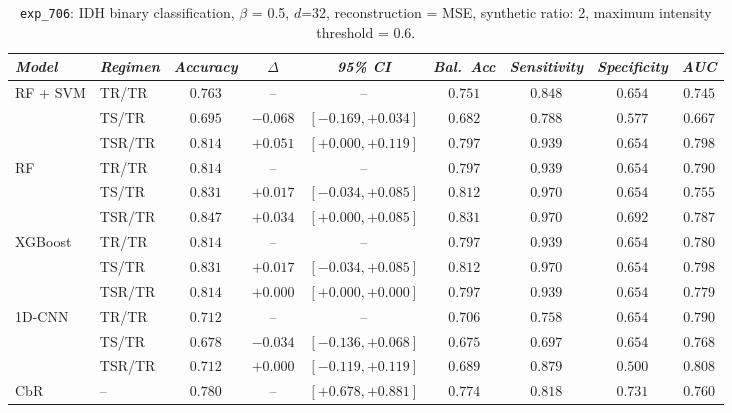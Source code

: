 \begin{table}[H]
\centering
\scriptsize

\label{tab:ctrl_exp_706}
\begin{tabular*}{\textwidth}{@{\extracolsep{\fill}}llccccccc}
\toprule
\emph{Model} & \emph{Regimen} & \emph{Accuracy} & \emph{$\Delta$} & \emph{95\% CI} & \emph{Bal.\ Acc} & \emph{Sensitivity} & \emph{Specificity} & \emph{AUC}\\
\midrule
\multirow{3}{*}{RF + SVM} & TR/TR & $0.763$ & -- & -- & $0.751$ & $0.848$ & $0.654$ & $0.745$\\
 & TS/TR & $0.695$ & $-0.068$ & $[-0.169, +0.034]$ & $0.682$ & $0.788$ & $0.577$ & $0.667$\\
 & TSR/TR & $0.814$ & $+0.051$ & $[+0.000, +0.119]$ & $0.797$ & $0.939$ & $0.654$ & $0.798$\\
\midrule
\multirow{3}{*}{RF} & TR/TR & $0.814$ & -- & -- & $0.797$ & $0.939$ & $0.654$ & $0.790$\\
 & TS/TR & $0.831$ & $+0.017$ & $[-0.034, +0.085]$ & $0.812$ & $0.970$ & $0.654$ & $0.755$\\
 & TSR/TR & $0.847$ & $+0.034$ & $[+0.000, +0.085]$ & $0.831$ & $0.970$ & $0.692$ & $0.787$\\
\midrule
\multirow{3}{*}{XGBoost} & TR/TR & $0.814$ & -- & -- & $0.797$ & $0.939$ & $0.654$ & $0.780$\\
 & TS/TR & $0.831$ & $+0.017$ & $[-0.034, +0.085]$ & $0.812$ & $0.970$ & $0.654$ & $0.798$\\
 & TSR/TR & $0.814$ & $+0.000$ & $[+0.000, +0.000]$ & $0.797$ & $0.939$ & $0.654$ & $0.779$\\
\midrule
\multirow{3}{*}{1D-CNN} & TR/TR & $0.712$ & -- & -- & $0.706$ & $0.758$ & $0.654$ & $0.790$\\
 & TS/TR & $0.678$ & $-0.034$ & $[-0.136, +0.068]$ & $0.675$ & $0.697$ & $0.654$ & $0.768$\\
 & TSR/TR & $0.712$ & $+0.000$ & $[-0.119, +0.119]$ & $0.689$ & $0.879$ & $0.500$ & $0.808$\\
\midrule
CbR & -- & $0.780$ & -- & $[+0.678, +0.881]$ & $0.774$ & $0.818$ & $0.731$ & $0.760$\\
\bottomrule
\end{tabular*}
\caption{\small \texttt{exp\_706}: IDH binary classification, $\beta$ = 0.5, $d$=32, reconstruction = MSE, synthetic ratio: 2, maximum intensity threshold = 0.6.}
\end{table}

